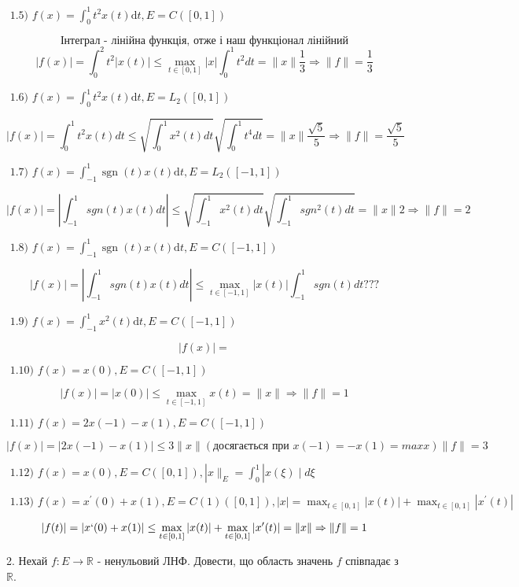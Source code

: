 \begin{tcolorbox}
    $
    \text { 1.5) } f(x)=\int_{0}^{1} t^{2} x(t) \mathrm{d} t, E=C([0,1]) 
    $

    $$ \text{Інтеграл - лінійна функція, отже і наш функціонал лінійний} $$
    $$ |f(x)| = \int_0^2 t^2 |x(t)| \le \max_{t \in[0,1]}|x|\int_{0}^{1}t^2dt = 
    \|x\| \frac{1}{3} \Rightarrow \|f\| = \frac{1}{3}$$

    $
    \text { 1.6) } f(x)=\int_{0}^{1} t^{2} x(t) \mathrm{d} t, E=L_{2}([0,1]) 
    $

    $$ |f(x)| = \int_0^1t^2x(t)dt \le 
    \sqrt{\int_0^1x^2(t)dt} \sqrt{\int_0^1t^4dt} = 
    \|x\|\frac{\sqrt{5}}{5} \Rightarrow \|f\|=\frac{\sqrt{5}}{5}$$

    $
    \text { 1.7) } f(x)=\int_{-1}^{1} \operatorname{sgn}(t) x(t) \mathrm{d} t, E=L_{2}([-1,1]) 
    $

    $$ |f(x)| = |\int_{-1}^1sgn(t)x(t)dt| \le 
    \sqrt{\int_{-1}^1x^2(t)dt} \sqrt{\int_{-1}^{1}sgn^2(t)dt} = 
    \|x\| 2 \Rightarrow \|f\| = 2 $$

    $
    \text { 1.8) } f(x)=\int_{-1}^{1} \operatorname{sgn}(t) x(t) \mathrm{d} t, E=C([-1,1]) 
    $
    
    $$ |f(x)| = |\int_{-1}^1sgn(t)x(t)dt| \le 
    \max_{t \in [-1, 1]} |x(t)| \int_{-1}^1sgn(t)dt ??? $$


    $
    \text { 1.9) } f(x)=\int_{-1}^{1} x^{2}(t) \mathrm{d} t, E=C([-1,1]) 
    $

    $$ |f(x)| =  $$

    $
    \text { 1.10) } f(x)=x(0), E=C([-1,1]) 
    $

    $$|f(x)| = |x(0)| \le \max_{t\in[-1, 1]}x(t) = \|x\| \Rightarrow \|f\| = 1$$

    $
    \text { 1.11) } f(x)=2 x(-1)-x(1), E=C([-1,1]) 
    $

    $$ |f(x)| = |2x(-1) - x(1)| \le 3\|x\| (\text{досягається при } x(-1) = -x(1) = max x) 
    \|f\| = 3 $$

    $
    \text { 1.12) } f(x)=x(0), E=C([0,1]),|x \|_{E}=\int_{0}^{1}| x(\xi) \mid d \xi 
    $

    $
    \text { 1.13) } f(x)=x^{\prime}(0)+x(1), E=C(1)([0,1]),|x|=\max _{t \in[0,1]}|x(t)|+\max _{t \in[0,1]}|x^{\prime}(t)|
    $

    $$|f(t)| = |x`(0) + x(1)| \le \max _{t \in[0,1]}|x(t)|+\max _{t \in[0,1]}|x^{\prime}(t)|=
    \|x\| \Rightarrow \|f\| = 1 $$


\end{tcolorbox}

\begin{tcolorbox}[title=Завдання 2]
    2. Нехай $f: E \rightarrow \mathbb{R}$ - ненульовий ЛНФ. Довести, що область значень $f$ співпадає з $\mathbb{R}$.
\end{tcolorbox}